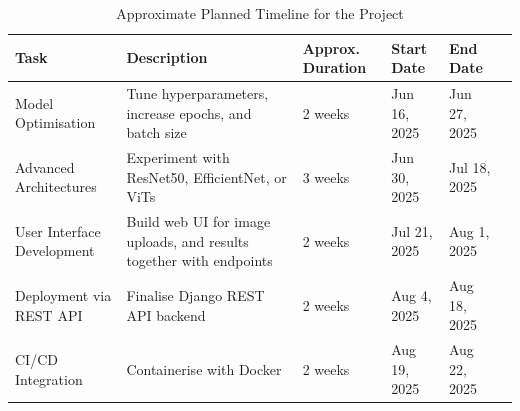 \documentclass[../main]{subfiles}
\begin{document}
\begin{table}[ht]
\centering
\begin{adjustbox}{width=\textwidth}
\begin{tabularx}{\textwidth}{|L{3.2cm}|X|X|L{1.8cm}|L{1.8cm}|L{1.8cm}|}
\hline
\textbf{Task} & \textbf{Description} & \textbf{Approx. Duration} & \textbf{Start Date} & \textbf{End Date} \\
\hline
Model Optimisation & Tune hyperparameters, increase epochs, and batch size & 2 weeks & Jun 16, 2025 & Jun 27, 2025 \\
\hline
Advanced Architectures & Experiment with ResNet50, EfficientNet, or ViTs & 3 weeks & Jun 30, 2025 & Jul 18, 2025 \\
\hline
	User Interface Development & Build web UI for image uploads, and results together with endpoints & 2 weeks & Jul 21, 2025 & Aug 1, 2025\\
\hline
Deployment via REST API & Finalise Django REST API backend & 2 weeks &  Aug 4, 2025 & Aug 18, 2025\\
\hline
CI/CD Integration & Containerise with Docker & 2 weeks &  Aug 19, 2025 & Aug 22, 2025\\
\hline
\end{tabularx}
\end{adjustbox}
\caption{Approximate Planned Timeline for the Project}
\label{tab:project_timeline}
\end{table}
\end{document}
